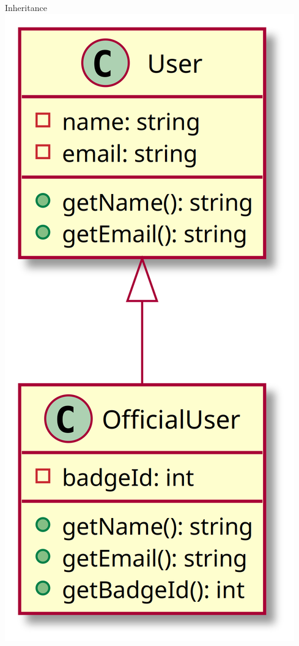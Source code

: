 \begin{frame}[fragile,c]
    \begin{minipage}{.45\textwidth}
        \begin{center}
            \large{Inheritance}
            \includegraphics[height=.75\textheight]{src/session--composition-and-inheritance/resources/Inheritance.png}
        \end{center}
    \end{minipage}
\end{frame}

